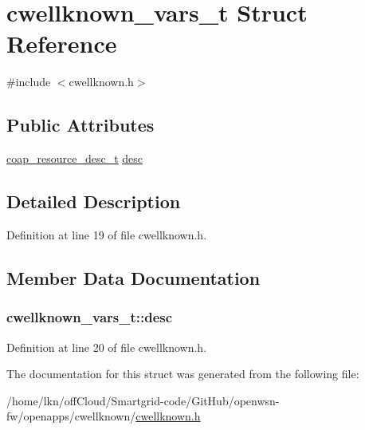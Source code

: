 \hypertarget{structcwellknown__vars__t}{}\section{cwellknown\+\_\+vars\+\_\+t Struct Reference}
\label{structcwellknown__vars__t}


{\ttfamily \#include $<$cwellknown.\+h$>$}

\subsection*{Public Attributes}
\begin{DoxyCompactItemize}
\item 
\hyperlink{structcoap__resource__desc__t}{coap\+\_\+resource\+\_\+desc\+\_\+t} \hyperlink{structcwellknown__vars__t_af4cf4a0e687a4ed6b14883402b21c2e4}{desc}
\end{DoxyCompactItemize}


\subsection{Detailed Description}


Definition at line 19 of file cwellknown.\+h.



\subsection{Member Data Documentation}
\subsubsection[{\texorpdfstring{desc}{desc}}]{ cwellknown\+\_\+vars\+\_\+t\+::desc}\hypertarget{structcwellknown__vars__t_af4cf4a0e687a4ed6b14883402b21c2e4}{}\label{structcwellknown__vars__t_af4cf4a0e687a4ed6b14883402b21c2e4}


Definition at line 20 of file cwellknown.\+h.



The documentation for this struct was generated from the following file\+:\begin{DoxyCompactItemize}
\item 
/home/lkn/off\+Cloud/\+Smartgrid-\/code/\+Git\+Hub/openwsn-\/fw/openapps/cwellknown/\hyperlink{cwellknown_8h}{cwellknown.\+h}\end{DoxyCompactItemize}
